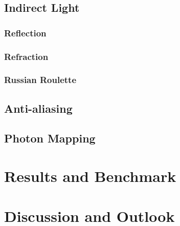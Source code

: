 \documentclass[a4paper, twocolumn]{article}
\begin{document}
    \subsection{Indirect Light} \label{sec:indirect_light}
    \subsubsection{Reflection} \label{sec:reflection}
    \subsubsection{Refraction} \label{sec:refraction}
    \subsubsection{Russian Roulette} \label{sec:russian_roulette}
    
    \subsection{Anti-aliasing} \label{sec:anti-aliasing}

    \subsection{Photon Mapping} \label{sec:photon_mapping}

    
    \section{Results and Benchmark} \label{sec:results_and_benchmark}

    \section{Discussion and Outlook} \label{sec:discussion_and_outlook}

    \newpage %
    \nocite{*} %
    
    
\end{document}
